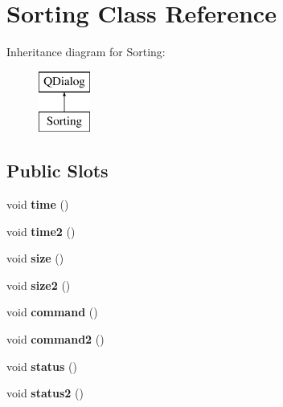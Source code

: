 \hypertarget{class_sorting}{}\section{Sorting Class Reference}
\label{class_sorting}
Inheritance diagram for Sorting\+:\begin{figure}[H]
\begin{center}
\leavevmode
\includegraphics[height=2.000000cm]{class_sorting}
\end{center}
\end{figure}
\subsection*{Public Slots}
\begin{DoxyCompactItemize}
\item 
void {\bfseries time} ()\hypertarget{class_sorting_af8aa0115ea559d7adde8c7aa94fc837c}{}\label{class_sorting_af8aa0115ea559d7adde8c7aa94fc837c}

\item 
void {\bfseries time2} ()\hypertarget{class_sorting_a0b1cc019829b5d2602cb994f1d9fc999}{}\label{class_sorting_a0b1cc019829b5d2602cb994f1d9fc999}

\item 
void {\bfseries size} ()\hypertarget{class_sorting_a535989339097fe845468fd8aee18d8ad}{}\label{class_sorting_a535989339097fe845468fd8aee18d8ad}

\item 
void {\bfseries size2} ()\hypertarget{class_sorting_acd7b27aab2a5ff7ccbf975402dd3719b}{}\label{class_sorting_acd7b27aab2a5ff7ccbf975402dd3719b}

\item 
void {\bfseries command} ()\hypertarget{class_sorting_ad60f899f4912d268e58fb7abc301a2a3}{}\label{class_sorting_ad60f899f4912d268e58fb7abc301a2a3}

\item 
void {\bfseries command2} ()\hypertarget{class_sorting_a4ec902e66832850acbe37d24aa858457}{}\label{class_sorting_a4ec902e66832850acbe37d24aa858457}

\item 
void {\bfseries status} ()\hypertarget{class_sorting_aeac6672a985d3add82a595f45775897b}{}\label{class_sorting_aeac6672a985d3add82a595f45775897b}

\item 
void {\bfseries status2} ()\hypertarget{class_sorting_af640e0213df2a2d937a3d78e1553a1d8}{}\label{class_sorting_af640e0213df2a2d937a3d78e1553a1d8}

\end{DoxyCompactItemize}
